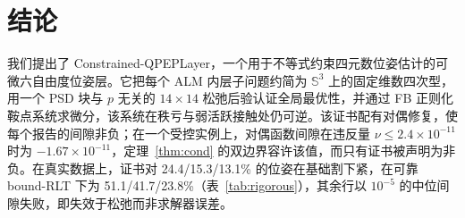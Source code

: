 \section{结论}\label{sec:conclusion}
我们提出了 Constrained-QPEPLayer，一个用于不等式约束四元数位姿估计的可微六自由度位姿层。它把每个 ALM 内层子问题约简为 $\mathbb{S}^3$ 上的固定维数四次型，用一个 PSD 块与 $p$ 无关的 $14\times14$ 松弛后验认证全局最优性，并通过 FB 正则化鞍点系统求微分，该系统在秩亏与弱活跃接触处仍可逆。该证书配有对偶修复，使每个报告的间隙非负；在一个受控实例上，对偶函数间隙在违反量 $\nu\le2.4\times10^{-11}$ 时为 $-1.67\times10^{-11}$，定理~\ref{thm:cond} 的双边界容许该值，而只有证书被声明为非负。在真实数据上，证书对 24.4/15.3/13.1\% 的位姿在基础割下紧，在可靠 bound-RLT 下为 51.1/41.7/23.8\%（表~\ref{tab:rigorous}），其余行以 $10^{-5}$ 的中位间隙失败，即失效于松弛而非求解器误差。
